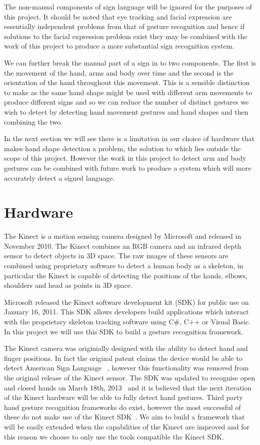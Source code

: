 The non-manual components of sign language will be ignored for the purposes of this project. It should be noted that eye tracking and facial expression are essentially independent problems from that of gesture recognition and hence if solutions to the facial expression problem exist they may be combined with the work of this project to produce a more substantial sign recognition system.

We can further break the manual part of a sign in to two components. The first is the movement of the hand, arms and body over time and the second is the orientation of the hand throughout this movement. This is a sensible distinction to make as the same hand shape might be used with different arm movements to produce different signs and so we can reduce the number of distinct gestures we wish to detect by detecting hand movement gestures and hand shapes and then combining the two.

In the next section we will see there is a limitation in our choice of hardware that makes hand shape detection a problem, the solution to which lies outside the scope of this project. However the work in this project to detect arm and body gestures can be combined with future work to produce a system which will more accurately detect a signed language. 

\section{Hardware}
The Kinect is a motion sensing camera designed by Microsoft and released in November 2010. The Kinect combines an RGB camera and an infrared depth sensor to detect objects in 3D space. The raw images of these sensors are combined using proprietary software to detect a human body as a skeleton, in particular the Kinect is capable of detecting the positions of the hands, elbows, shoulders and head as points in 3D space.

Microsoft released the Kinect software development kit (SDK) for public use on January 16, 2011. This SDK allows developers build applications which interact with the proprietary skeleton tracking software using C\#, C++ or Visual Basic. In this project we will use this SDK to build a gesture recognition framework.

The Kinect camera was originially designed with the ability to detect hand and finger positions. In fact the original patent claims the device would be able to detect American Sign Language ~\citep{LATTA:2010:biblatex}, however this functionality was removed from the original release of the Kinect sensor. The SDK was updated to recognise open and closed hands on March 18th, 2013~\citep{Microsoft:2013:Online} and it is believed that the next iteration of the Kinect hardware will be able to fully detect hand gestures. Third party hand gesture recognition frameworks do exist, however the most successful of these do not make use of the Kinect SDK~\citep{Forth:2013:Online}. We aim to build a framework that will be easily extended when the capabilities of the Kinect are improved and for this reason we choose to only use the tools compatible the Kinect SDK.

